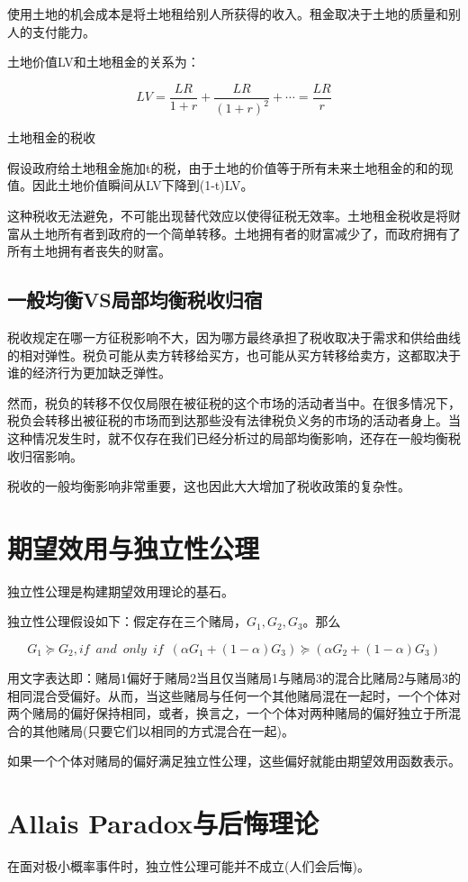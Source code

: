 \documentclass{article}
\begin{document}
使用土地的机会成本是将土地租给别人所获得的收入。租金取决于土地的质量和别人的支付能力。

土地价值LV和土地租金的关系为：

\[
LV=\frac{LR}{1+r}+\frac{LR}{(1+r)^2}+\cdots=\frac{LR}{r}
\]

\hspace*{\fill}

土地租金的税收

假设政府给土地租金施加t的税，由于土地的价值等于所有未来土地租金的和的现值。因此土地价值瞬间从LV下降到(1-t)LV。

这种税收无法避免，不可能出现替代效应以使得征税无效率。土地租金税收是将财富从土地所有者到政府的一个简单转移。土地拥有者的财富减少了，而政府拥有了所有土地拥有者丧失的财富。

\subsection{一般均衡VS局部均衡税收归宿}

税收规定在哪一方征税影响不大，因为哪方最终承担了税收取决于需求和供给曲线的相对弹性。税负可能从卖方转移给买方，也可能从买方转移给卖方，这都取决于谁的经济行为更加缺乏弹性。

然而，税负的转移不仅仅局限在被征税的这个市场的活动者当中。在很多情况下，税负会转移出被征税的市场而到达那些没有法律税负义务的市场的活动者身上。当这种情况发生时，就不仅存在我们已经分析过的局部均衡影响，还存在一般均衡税收归宿影响。

税收的一般均衡影响非常重要，这也因此大大增加了税收政策的复杂性。

\section{期望效用与独立性公理}

独立性公理是构建期望效用理论的基石。

独立性公理假设如下：假定存在三个赌局，$ G_1,G_2,G_3 $。那么

\[
G_1\succeq G_2, if\enspace  and\enspace only\enspace if \enspace (\alpha G_1+(1-\alpha)G_3)\succeq(\alpha G_2+(1-\alpha)G_3)
\]

用文字表达即：赌局1偏好于赌局2当且仅当赌局1与赌局3的混合比赌局2与赌局3的相同混合受偏好。从而，当这些赌局与任何一个其他赌局混在一起时，一个个体对两个赌局的偏好保持相同，或者，换言之，一个个体对两种赌局的偏好独立于所混合的其他赌局(只要它们以相同的方式混合在一起)。

\hspace*{\fill}

如果一个个体对赌局的偏好满足独立性公理，这些偏好就能由期望效用函数表示。

\section{Allais Paradox与后悔理论}

在面对极小概率事件时，独立性公理可能并不成立(人们会后悔)。


	
	
\end{document}
